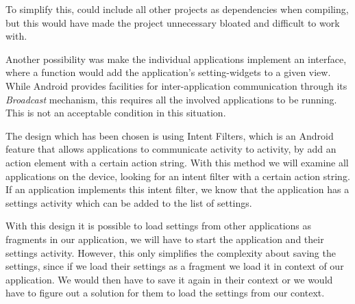 To simplify this, \launcher could include all other projects as dependencies when compiling, but this would have made the \launcher project unnecessary bloated and difficult to work with.

Another possibility was make the individual applications implement an interface, where a function would add the application's setting-widgets to a given view.
While Android provides facilities for inter-application communication through its \textit{Broadcast} mechanism\cite{broadcastReceiver}, this requires all the involved applications to be running.
This is not an acceptable condition in this situation. 

The design which has been chosen is using Intent Filters, which is an Android feature that allows applications to communicate activity to activity, by add an action element with a certain action string\cite{intentFilter}.
With this method we will examine all applications on the device, looking for an intent filter with a certain action string.
If an application implements this intent filter, we know that the application has a settings activity which can be added to the list of settings.

With this design it is possible to load settings from other applications as fragments in our application, we will have to start the application and their settings activity. However, this only simplifies the complexity about saving the settings, since if we load their settings as a fragment we load it in context of our application. 
We would then have to save it again in their context or we would have to figure out a solution for them to load the settings from our context.